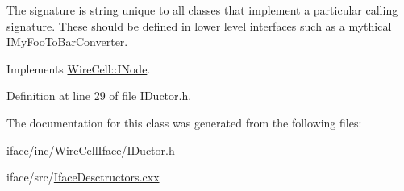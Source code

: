The signature is string unique to all classes that implement a particular calling signature. These should be defined in lower level interfaces such as a mythical I\+My\+Foo\+To\+Bar\+Converter. 

Implements \hyperlink{class_wire_cell_1_1_i_node_a0b0763465adf5ba7febe8e378162b584}{Wire\+Cell\+::\+I\+Node}.



Definition at line 29 of file I\+Ductor.\+h.



The documentation for this class was generated from the following files\+:\begin{DoxyCompactItemize}
\item 
iface/inc/\+Wire\+Cell\+Iface/\hyperlink{_i_ductor_8h}{I\+Ductor.\+h}\item 
iface/src/\hyperlink{_iface_desctructors_8cxx}{Iface\+Desctructors.\+cxx}\end{DoxyCompactItemize}
